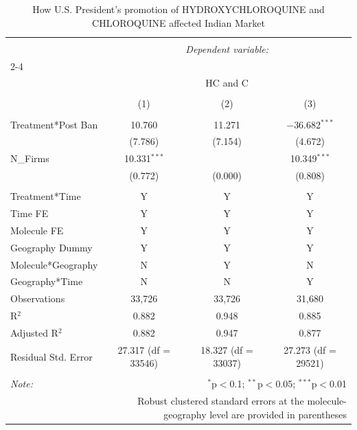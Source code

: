 \documentclass[12pt,english]{article}
\begin{document}
\begin{table}[H] \centering 
	\caption{How U.S. President's promotion of  HYDROXYCHLOROQUINE and CHLOROQUINE affected Indian Market} 
	\label{} 
	\footnotesize 
	\begin{tabular}{@{\extracolsep{1pt}}lccc} 
		\\[-1.8ex]\hline 
		\hline \\[-1.8ex] 
		& \multicolumn{3}{c}{\textit{Dependent variable:}} \\ 
		\cline{2-4} 
		\\[-1.8ex] & \multicolumn{3}{c}{HC and C} \\ 
		\\[-1.8ex] & (1) & (2) & (3)\\ 
		\hline \\[-1.8ex] 
		Treatment*Post Ban & 10.760 & 11.271 & $-$36.682$^{***}$ \\ 
		& (7.786) & (7.154) & (4.672) \\ 
		N_Firms & 10.331$^{***}$ &  & 10.349$^{***}$ \\ 
		& (0.772) & (0.000) & (0.808) \\ 
		\hline \\[-1.8ex] 
		Treatment*Time & Y & Y & Y \\ 
		Time FE & Y & Y & Y \\ 
		Molecule FE & Y & Y & Y \\ 
		Geography Dummy & Y & Y & Y \\ 
		Molecule*Geography & N & Y & N \\ 
		Geography*Time & N & N & Y \\ 
		Observations & 33,726 & 33,726 & 31,680 \\ 
		R$^{2}$ & 0.882 & 0.948 & 0.885 \\ 
		Adjusted R$^{2}$ & 0.882 & 0.947 & 0.877 \\ 
		Residual Std. Error & 27.317 (df = 33546) & 18.327 (df = 33037) & 27.273 (df = 29521) \\ 
		\hline 
		\hline \\[-1.8ex] 
		\textit{Note:}  & \multicolumn{3}{r}{$^{*}$p$<$0.1; $^{**}$p$<$0.05; $^{***}$p$<$0.01} \\ 
		& \multicolumn{3}{r}{Robust clustered standard errors at the molecule-geography level are provided in parentheses} \\ 
	\end{tabular} 
\end{table} 
\end{document}
